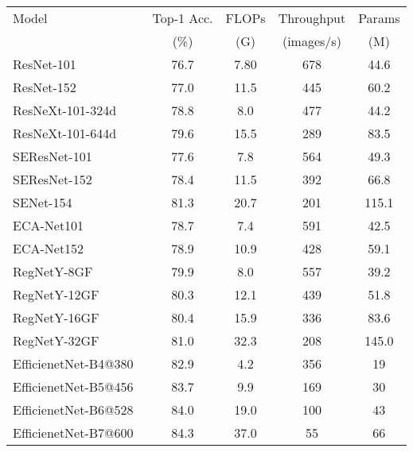 \documentclass[10pt,twocolumn,letterpaper]{article}
\begin{document}
\begin{table}[t]
    \centering
    \begin{adjustbox}{max width=\linewidth}
    \begin{tabular}{l|c|c|c|c}
        \toprule
             Model   & Top-1 Acc. & FLOPs & Throughput & Params \\ 
                     & (\%) &  (G) & (images/s) & (M) \\
        \midrule
        
ResNet-101~\cite{ResNet_He_2016_CVPR} & 76.7 & 7.80 & 678 & 44.6 \\
ResNet-152~\cite{ResNet_He_2016_CVPR} & 77.0 & 11.5 & 445 & 60.2 \\
\midrule
ResNeXt-101-324d~\cite{ResNeXt_Xie_2017_CVPR} & 78.8 & 8.0 & 477 & 44.2 \\
ResNeXt-101-644d~\cite{ResNeXt_Xie_2017_CVPR} & 79.6 & 15.5 & 289 & 83.5 \\
\midrule
SEResNet-101~\cite{SENet_Hu_2018} & 77.6 & 7.8 & 564 & 49.3 \\
SEResNet-152~\cite{SENet_Hu_2018} & 78.4 & 11.5 & 392 & 66.8 \\
SENet-154~\cite{SENet_Hu_2018} & 81.3 & 20.7 & 201 & 115.1\\
\midrule
ECA-Net101~\cite{ECA_wang2020} & 78.7 & 7.4 & 591 & 42.5 \\
ECA-Net152~\cite{ECA_wang2020} & 78.9 & 10.9 & 428 & 59.1 \\
\midrule
RegNetY-8GF~\cite{RegNet_Radosavovic_2020_CVPR} & 79.9 & 8.0 & 557 & 39.2 \\ RegNetY-12GF~\cite{RegNet_Radosavovic_2020_CVPR} & 80.3 & 12.1 & 439 & 51.8 \\ RegNetY-16GF~\cite{RegNet_Radosavovic_2020_CVPR} & 80.4 & 15.9 & 336 & 83.6 \\
RegNetY-32GF~\cite{RegNet_Radosavovic_2020_CVPR} & 81.0 & 32.3 & 208 & 145.0  \\

\midrule
EfficienetNet-B4@380~\cite{efficientnet_pmlr_tan_19}& 82.9& 4.2 & 356 & 19 \\
EfficienetNet-B5@456~\cite{efficientnet_pmlr_tan_19}& 83.7& 9.9 & 169 & 30 \\
EfficienetNet-B6@528~\cite{efficientnet_pmlr_tan_19}& 84.0& 19.0 & 100 & 43 \\
EfficienetNet-B7@600~\cite{efficientnet_pmlr_tan_19}& 84.3& 37.0 & 55 & 66 \\



\end{tabular}
\end{adjustbox}
\end{table}
\end{document}
